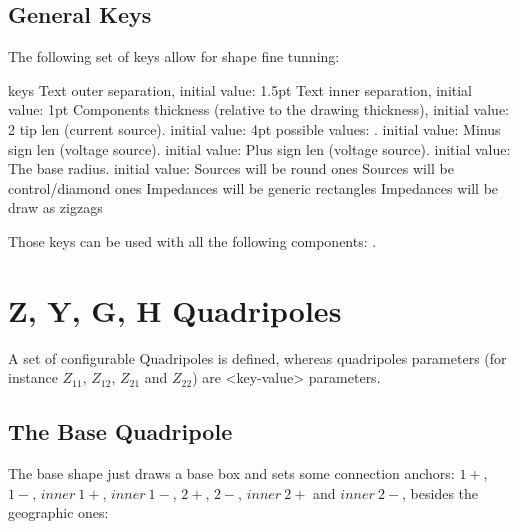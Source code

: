 \documentclass[a4paper, titlepage]{article}
\begin{document}
\subsection{General Keys}\label{generalkeys}
The following set of keys allow for shape fine tunning:
\begin{describelist*}[30mm]{keys}
    {Text outer separation, initial value: 1.5pt}
    {Text inner separation, initial value: 1pt}
   {Components thickness (relative to the drawing thickness), initial value: 2}
   {tip len (current source). initial value: 4pt}
   {possible values: . initial value: }
    {Minus sign len (voltage source). initial value: }
    {Plus sign len (voltage source). initial value: }
   {The base radius. initial value: }
   {Sources will be round ones}
   {Sources will be control/diamond ones}
   {Impedances will be generic rectangles}
   {Impedances will be draw as zigzags}
\end{describelist*}
\begin{tsremark}
Those keys can be used with all the following components: .
\end{tsremark}





\section{Z, Y, G, H Quadripoles}\label{quadanchors}
A set of configurable Quadripoles is defined, whereas quadripoles parameters (for instance $Z_{11}$, $Z_{12}$, $Z_{21}$ and $Z_{22}$) are <key-value> parameters.
\subsection{The Base Quadripole}
The base shape just draws a base box and sets some connection anchors: $1+$, $1-$, $inner\ 1+$, $inner\ 1-$, $2+$, $2-$, $inner\ 2+$ and $inner\ 2-$, besides the geographic ones:
\end{document}
